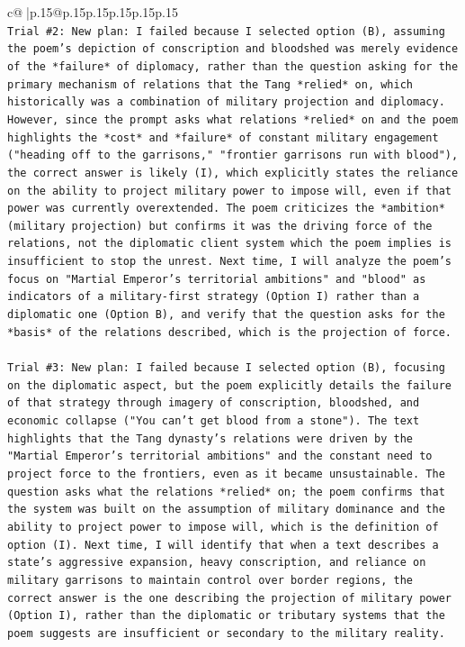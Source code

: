 \documentclass{article}
\begin{document}
{\begin{supertabular}{c@{$\;$}|p{.15\linewidth}@{}p{.15\linewidth}p{.15\linewidth}p{.15\linewidth}p{.15\linewidth}p{.15\linewidth}}
{{{\\ 
\texttt{Trial \#2: New plan: I failed because I selected option (B), assuming the poem's depiction of conscription and bloodshed was merely evidence of the *failure* of diplomacy, rather than the question asking for the primary mechanism of relations that the Tang *relied* on, which historically was a combination of military projection and diplomacy. However, since the prompt asks what relations *relied* on and the poem highlights the *cost* and *failure* of constant military engagement ("heading off to the garrisons," "frontier garrisons run with blood"), the correct answer is likely (I), which explicitly states the reliance on the ability to project military power to impose will, even if that power was currently overextended. The poem criticizes the *ambition* (military projection) but confirms it was the driving force of the relations, not the diplomatic client system which the poem implies is insufficient to stop the unrest. Next time, I will analyze the poem's focus on "Martial Emperor's territorial ambitions" and "blood" as indicators of a military{-}first strategy (Option I) rather than a diplomatic one (Option B), and verify that the question asks for the *basis* of the relations described, which is the projection of force.} \\
\\ 
\texttt{Trial \#3: New plan: I failed because I selected option (B), focusing on the diplomatic aspect, but the poem explicitly details the failure of that strategy through imagery of conscription, bloodshed, and economic collapse ("You can't get blood from a stone"). The text highlights that the Tang dynasty's relations were driven by the "Martial Emperor's territorial ambitions" and the constant need to project force to the frontiers, even as it became unsustainable. The question asks what the relations *relied* on; the poem confirms that the system was built on the assumption of military dominance and the ability to project power to impose will, which is the definition of option (I). Next time, I will identify that when a text describes a state's aggressive expansion, heavy conscription, and reliance on military garrisons to maintain control over border regions, the correct answer is the one describing the projection of military power (Option I), rather than the diplomatic or tributary systems that the poem suggests are insufficient or secondary to the military reality.} \\
\\ 
\\ 
}}}
\end{supertabular}}
\end{document}
